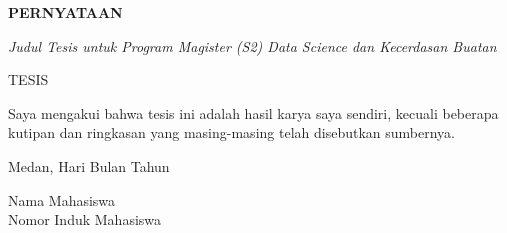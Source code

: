 \thispagestyle{empty}
\begin{center}
{\bfseries PERNYATAAN\par}
\vspace{18mm}
\textit{Judul Tesis untuk Program Magister (S2) Data Science dan Kecerdasan Buatan}\par
\vspace{4mm}
TESIS
\end{center}

\vspace{10mm}
\noindent Saya mengakui bahwa tesis ini adalah hasil karya saya sendiri, kecuali beberapa kutipan dan ringkasan yang masing-masing telah disebutkan sumbernya.

\vspace{18mm}
\noindent Medan, Hari Bulan Tahun

\vspace{24mm}
\noindent Nama Mahasiswa\\
Nomor Induk Mahasiswa
\clearpage
